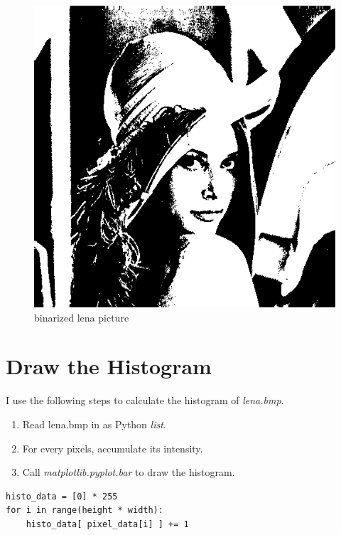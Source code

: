 \documentclass[12pt,twoside,a4paper]{article}
\begin{document}
\begin{figure}[H]
\centering
\includegraphics[scale=0.4]{lena-binarized.bmp}
\caption{binarized lena picture}
\label{fig:lena-binarized.bmp}
\end{figure}

\section{Draw the Histogram}
I use the following steps to calculate the histogram of \textit{lena.bmp}.
\begin{enumerate}
	\item Read lena.bmp in as Python \textit{list}.
	\item For every pixels, accumulate its intensity.
	\item Call \textit{matplotlib.pyplot.bar} to draw the histogram.
\end{enumerate}
\begin{lstlisting}[caption=Accumulating the intensity]
histo_data = [0] * 255
for i in range(height * width):
    histo_data[ pixel_data[i] ] += 1
\end{lstlisting}
\end{document}
